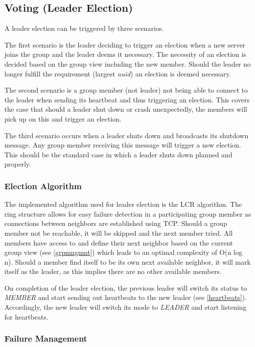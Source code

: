 \documentclass[runningheads]{llncs}
\begin{document}
\subsection{Voting (Leader Election)}

A leader election can be triggered by three scenarios.

The first scenario is the leader deciding to trigger an election when a new server joins the group and the leader deems it necessary. The necessity of an election is decided based on the group view including the new member. Should the leader no longer fulfill the requirement (largest \textit{uuid}) an election is deemed necessary.

The second scenario is a group member (not leader) not being able to connect to the leader when sending its heartbeat and thus triggering an election. This covers the case that should a leader shut down or crash unexpectedly, the members will pick up on this and trigger an election.

The third scenario occurs when a leader shuts down and broadcasts its shutdown message. Any group member receiving this message will trigger a new election. This should be the standard case in which a leader shuts down planned and properly.

\subsubsection{Election Algorithm}

The implemented algorithm used for leader election is the LCR algorithm. The ring structure allows for easy failure detection in a participating group member as connections between neighbors are established using TCP. Should a group member not be reachable, it will be skipped and the next member tried. All members have access to and define their next neighbor based on the current group view (see \ref{grpmngmnt}) which leads to an optimal complexity of O(n log n). Should a member find itself to be its own next available neighbor, it will mark itself as the leader, as this implies there are no other available members.

On completion of the leader election, the previous leader will switch its status to \textit{MEMBER} and start sending out heartbeats to the new leader (see \ref{heartbeats}). Accordingly, the new leader will switch its mode to \textit{LEADER} and start listening for heartbeats.

\subsubsection{Failure Management}
\end{document}
